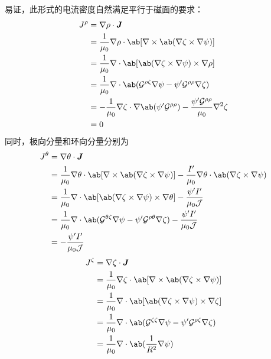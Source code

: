 易证，此形式的电流密度自然满足平行于磁面的要求：
\begin{equation}\begin{aligned}
J^\rho &= \grad{\rho} \cdot \vector{J} \\
&= \frac{1}{\mu_0} \grad{\rho} \cdot \ab[\curl{\ab(\grad{\zeta} \times \grad{\ToroidalFlux})}] \\
&= \frac{1}{\mu_0} \dive{\ab[
    \ab(\grad{\zeta} \times \grad{\ToroidalFlux}) \times \grad{\rho}
]} \\
&= \frac{1}{\mu_0} \dive{\ab(
    \contraMetric{\rho\zeta} \grad{\ToroidalFlux}
    - \ToroidalFlux' \contraMetric{\rho\rho} \grad{\zeta}
)} \\
&= - \frac{1}{\mu_0} \grad{\zeta} \cdot \grad{\ab(
    \ToroidalFlux' \contraMetric{\rho\rho}
)}
- \frac{\ToroidalFlux' \contraMetric{\rho\rho}}{\mu_0} \laplace{\zeta} \\
&= 0
\end{aligned}\end{equation}
同时，极向分量和环向分量分别为
\begin{equation}\begin{aligned}
J^\theta &= \grad{\theta} \cdot \vector{J} \\
&= \frac{1}{\mu_0} \grad{\theta} \cdot \ab[
    \curl{\ab(\grad{\zeta} \times \grad{\ToroidalFlux})}
]
- \frac{I'}{\mu_0} \grad{\theta} \cdot \ab(\grad{\zeta} \times \grad{\ToroidalFlux}) \\
&= \frac{1}{\mu_0} \dive{\ab[
    \ab(\grad{\zeta} \times \grad{\ToroidalFlux}) \times \grad{\theta}
]} - \frac{\ToroidalFlux' I'}{\mu_0 \Jacobian} \\
&= \frac{1}{\mu_0} \dive{\ab(
    \contraMetric{\theta\zeta} \grad{\ToroidalFlux}
    - \ToroidalFlux' \contraMetric{\rho\theta} \grad{\zeta}
)} - \frac{\ToroidalFlux' I'}{\mu_0 \Jacobian} \\
&=  - \frac{\ToroidalFlux' I'}{\mu_0 \Jacobian}
\end{aligned}\end{equation}
\begin{equation}\begin{aligned}
J^\zeta &= \grad{\zeta} \cdot \vector{J} \\
&= \frac{1}{\mu_0} \grad{\zeta}
\cdot \ab[\curl{\ab(\grad{\zeta} \times \grad{\ToroidalFlux})}] \\
&= \frac{1}{\mu_0} \dive{\ab[
    \ab(\grad{\zeta} \times \grad{\ToroidalFlux}) \times \grad{\zeta}
]} \\
&= \frac{1}{\mu_0} \dive{\ab(
    \contraMetric{\zeta\zeta} \grad{\ToroidalFlux}
    - \ToroidalFlux' \contraMetric{\rho\zeta} \grad{\zeta}
)} \\
&= \frac{1}{\mu_0} \dive{\ab(
    \frac{1}{R^2} \grad{\ToroidalFlux}
)}
\end{aligned}\end{equation}
